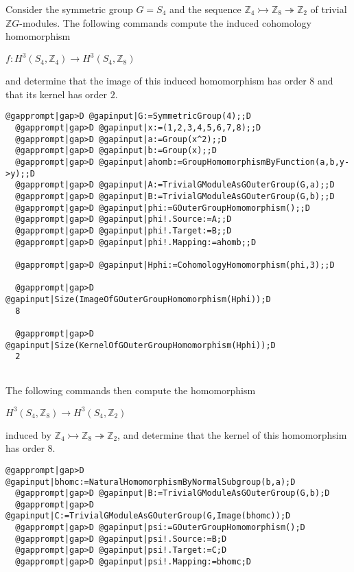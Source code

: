 \documentclass[a4paper,11pt]{report}
\begin{document}
{{ Consider the symmetric group $G=S_4$ and the sequence $ \mathbb Z_4 \rightarrowtail \mathbb Z_8 \twoheadrightarrow \mathbb Z_2$ of trivial $\mathbb ZG$-modules. The following commands compute the induced cohomology homomorphism 

$f\colon H^3(S_4,\mathbb Z_4) \rightarrow H^3(S_4,\mathbb Z_8)$ 

and determine that the image of this induced homomorphism has order $8$ and that its kernel has order $2$. 
\begin{Verbatim}[commandchars=@|D,fontsize=\small,frame=single,label=Example]
  @gapprompt|gap>D @gapinput|G:=SymmetricGroup(4);;D
  @gapprompt|gap>D @gapinput|x:=(1,2,3,4,5,6,7,8);;D
  @gapprompt|gap>D @gapinput|a:=Group(x^2);;D
  @gapprompt|gap>D @gapinput|b:=Group(x);;D
  @gapprompt|gap>D @gapinput|ahomb:=GroupHomomorphismByFunction(a,b,y->y);;D
  @gapprompt|gap>D @gapinput|A:=TrivialGModuleAsGOuterGroup(G,a);;D
  @gapprompt|gap>D @gapinput|B:=TrivialGModuleAsGOuterGroup(G,b);;D
  @gapprompt|gap>D @gapinput|phi:=GOuterGroupHomomorphism();;D
  @gapprompt|gap>D @gapinput|phi!.Source:=A;;D
  @gapprompt|gap>D @gapinput|phi!.Target:=B;;D
  @gapprompt|gap>D @gapinput|phi!.Mapping:=ahomb;;D
   
  @gapprompt|gap>D @gapinput|Hphi:=CohomologyHomomorphism(phi,3);;D
  
  @gapprompt|gap>D @gapinput|Size(ImageOfGOuterGroupHomomorphism(Hphi));D
  8
  
  @gapprompt|gap>D @gapinput|Size(KernelOfGOuterGroupHomomorphism(Hphi));D
  2
  
\end{Verbatim}
 

 The following commands then compute the homomorphism 

$H^3(S_4,\mathbb Z_8) \rightarrow H^3(S_4,\mathbb Z_2)$ 

induced by $\mathbb Z_4 \rightarrowtail \mathbb Z_8 \twoheadrightarrow \mathbb Z_2$, and determine that the kernel of this homomorphsim has order $8$. 
\begin{Verbatim}[commandchars=@|D,fontsize=\small,frame=single,label=Example]
  @gapprompt|gap>D @gapinput|bhomc:=NaturalHomomorphismByNormalSubgroup(b,a);D
  @gapprompt|gap>D @gapinput|B:=TrivialGModuleAsGOuterGroup(G,b);D
  @gapprompt|gap>D @gapinput|C:=TrivialGModuleAsGOuterGroup(G,Image(bhomc));D
  @gapprompt|gap>D @gapinput|psi:=GOuterGroupHomomorphism();D
  @gapprompt|gap>D @gapinput|psi!.Source:=B;D
  @gapprompt|gap>D @gapinput|psi!.Target:=C;D
  @gapprompt|gap>D @gapinput|psi!.Mapping:=bhomc;D
  

\end{Verbatim}}}
\end{document}
